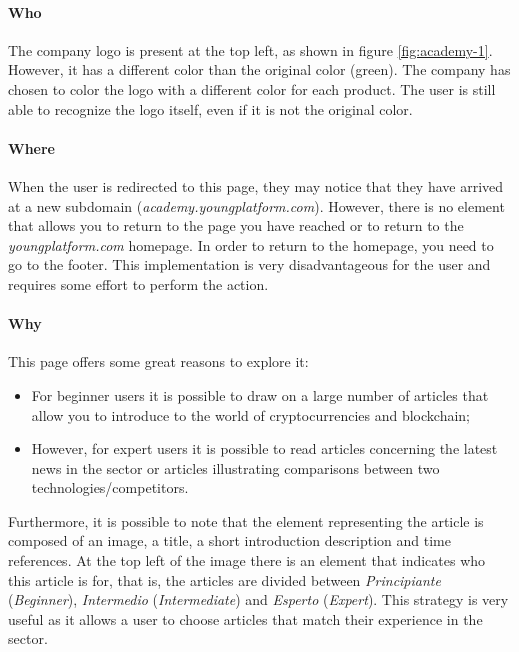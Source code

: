 \paragraph{Who}

The company logo is present at the top left, as shown in figure 
\ref{fig:academy-1}. However, it has a different color than the original 
color (green). The company has chosen to color the logo with a different 
color for each product. The user is still able to recognize the logo 
itself, even if it is not the original color. 

\paragraph{Where}

When the user is redirected to this page, they may notice that they have 
arrived at a new subdomain (\textit{academy.youngplatform.com}). However, 
there is no element that allows you to return to the page you have 
reached or to return to the \textit{youngplatform.com} homepage. In order 
to return to the homepage, you need to go to the footer. This 
implementation is very disadvantageous for the user and requires some 
effort to perform the action.

\paragraph{Why}

This page offers some great reasons to explore it:
\begin{itemize}
  \item For beginner users it is possible to draw on a large number of 
  articles that allow you to introduce to the world of cryptocurrencies 
  and blockchain;

  \item However, for expert users it is possible to read articles 
  concerning the latest news in the sector or articles illustrating 
  comparisons between two technologies/competitors.
\end{itemize}

Furthermore, it is possible to note that the element representing the 
article is composed of an image, a title, a short introduction description 
and time references. At the top left of the image there is an element 
that indicates who this article is for, that is, the articles are divided 
between \textit{Principiante} (\textit{Beginner}), \textit{Intermedio} 
(\textit{Intermediate}) and \textit{Esperto} (\textit{Expert}). 
This strategy is very useful as it allows a user to choose articles that 
match their experience in the sector.

